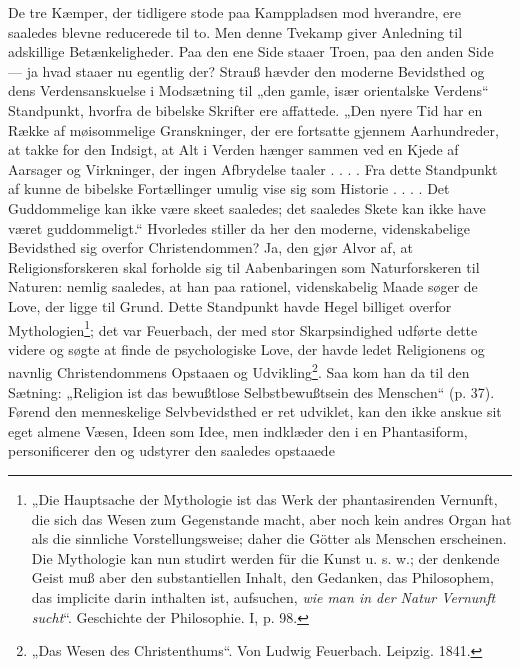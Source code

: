 \documentclass[12pt,a4paper]{book}
\newcommand{\opage}[1]{\marginnote{\footnotesize\textit{[#1]}}}
\begin{document}
De tre Kæmper, der tidligere stode paa Kamppladsen
mod hverandre, ere saaledes blevne reducerede til to. Men
denne Tvekamp giver Anledning til adskillige Betænkeligheder.
Paa den ene Side staaer Troen, paa den anden Side --- ja
hvad staaer nu egentlig der? Strauß hævder den moderne Bevidsthed
og dens Verdensanskuelse i Modsætning til „den gamle,
især orientalske Verdens“ Standpunkt, hvorfra de bibelske
Skrifter ere affattede. „Den nyere Tid har en Række af
møisommelige Granskninger, der ere fortsatte gjennem Aarhundreder,
at takke for den Indsigt, at Alt i Verden hænger
sammen ved en Kjede af Aarsager og Virkninger, der ingen
Afbrydelse taaler . . . . Fra dette Standpunkt af kunne de
bibelske Fortællinger umulig vise sig som Historie . . . . Det
Guddommelige kan ikke være skeet saaledes; det saaledes Skete
kan ikke have været guddommeligt.“ Hvorledes stiller da her
den moderne, videnskabelige Bevidsthed sig overfor Christendommen?
Ja, den gjør Alvor af, at Religionsforskeren skal
forholde sig til Aabenbaringen som Naturforskeren til Naturen:
nemlig saaledes, at han paa rationel, videnskabelig Maade
søger de Love, der ligge til Grund. Dette Standpunkt havde
Hegel billiget overfor Mythologien\footnote{„Die Hauptsache der Mythologie ist das Werk der phantasirenden
Vernunft, die sich das Wesen zum Gegenstande macht, aber noch
kein andres Organ hat als die sinnliche Vorstellungsweise; daher die
Götter als Menschen erscheinen. Die Mythologie
kan nun studirt
werden für die Kunst u. s. w.; der denkende Geist muß aber den substantiellen
Inhalt, den Gedanken, das Philosophem, das implicite
darin inthalten ist, aufsuchen, \emph{wie man in der Natur Vernunft
sucht}“. Geschichte der Philosophie. I, p. 98.}; det var Feuerbach, der
\opage{37}\setcounter{footnote}{0}%
med stor Skarpsindighed udførte dette videre og søgte at finde
de psychologiske Love, der havde ledet Religionens og navnlig
Christendommens Opstaaen og Udvikling\footnote{„Das Wesen des Christenthums“. Von Ludwig Feuerbach. Leipzig.
1841.}. Saa kom han da
til den Sætning: „Religion ist das bewußtlose Selbstbewußtsein
des Menschen“ (p. 37). Førend den menneskelige Selvbevidsthed
er ret udviklet, kan den ikke anskue sit eget almene
Væsen, Ideen som Idee, men indklæder den i en Phantasiform,
personificerer den og udstyrer den saaledes opstaaede
\end{document}
